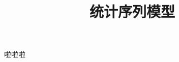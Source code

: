 \documentclass[letterpaper,10pt,oneside]{article}
\begin{document}
\title{统计序列模型}
\maketitle
啦啦啦
\end{document}
